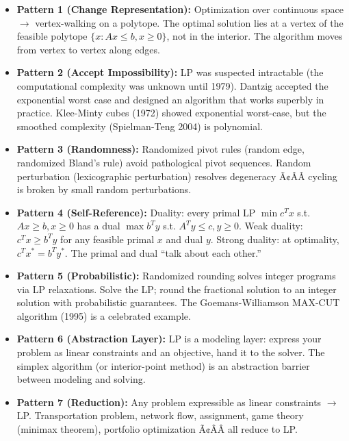 \begin{itemize}
\item \textbf{Pattern 1 (Change Representation):} Optimization over continuous space $\to$ vertex-walking on a polytope. The optimal solution lies at a vertex of the feasible polytope $\{x : Ax \le b, x \ge 0\}$, not in the interior. The algorithm moves from vertex to vertex along edges.

\item \textbf{Pattern 2 (Accept Impossibility):} LP was suspected intractable (the computational complexity was unknown until 1979). Dantzig accepted the exponential worst case and designed an algorithm that works superbly in practice. Klee-Minty cubes (1972) showed exponential worst-case, but the smoothed complexity (Spielman-Teng 2004) is polynomial.

\item \textbf{Pattern 3 (Randomness):} Randomized pivot rules (random edge, randomized Bland's rule) avoid pathological pivot sequences. Random perturbation (lexicographic perturbation) resolves degeneracy Ã¢ÂÂ cycling is broken by small random perturbations.

\item \textbf{Pattern 4 (Self-Reference):} Duality: every primal LP $\min c^T x$ s.t. $Ax \ge b, x \ge 0$ has a dual $\max b^T y$ s.t. $A^T y \le c, y \ge 0$. Weak duality: $c^T x \ge b^T y$ for any feasible primal $x$ and dual $y$. Strong duality: at optimality, $c^T x^* = b^T y^*$. The primal and dual ``talk about each other.''

\item \textbf{Pattern 5 (Probabilistic):} Randomized rounding solves integer programs via LP relaxations. Solve the LP; round the fractional solution to an integer solution with probabilistic guarantees. The Goemans-Williamson MAX-CUT algorithm (1995) is a celebrated example.

\item \textbf{Pattern 6 (Abstraction Layer):} LP is a modeling layer: express your problem as linear constraints and an objective, hand it to the solver. The simplex algorithm (or interior-point method) is an abstraction barrier between modeling and solving.

\item \textbf{Pattern 7 (Reduction):} Any problem expressible as linear constraints $\to$ LP. Transportation problem, network flow, assignment, game theory (minimax theorem), portfolio optimization Ã¢ÂÂ all reduce to LP.


\end{itemize}
